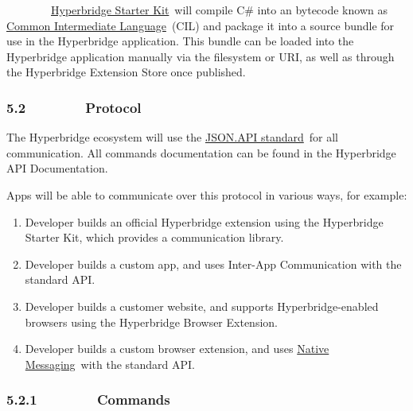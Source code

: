 \documentclass[]{article}
\providecommand{\tightlist}{%
  \setlength{\itemsep}{0pt}\setlength{\parskip}{0pt}}
\begin{document}
{~~~~~~~~}{\href{https://www.google.com/url?q=https://github.com/hyperbridge/app-extension-starter-kit\&sa=D\&ust=1512628005815000\&usg=AFQjCNF4Mysfxo1Na3-pmI7CPuwKxQxz5Q}{Hyperbridge
Starter Kit}}{~will compile C\# into an bytecode known as
}{\href{https://www.google.com/url?q=https://en.wikipedia.org/wiki/Common_Intermediate_Language\&sa=D\&ust=1512628005816000\&usg=AFQjCNFHw5_7yRB7FVoSH3CmepBrowLfZw}{Common
Intermediate Language}}{~(CIL) and package it into a source bundle for
use in the Hyperbridge application. This bundle can be loaded into the
Hyperbridge application manually via the filesystem or URI, as well as
through the Hyperbridge Extension Store once published.}

\hypertarget{h.we7809azv8r3}{%
\subsubsection{\texorpdfstring{{5.2~~~~~~~~Protocol}}{5.2~~~~~~~~Protocol}}\label{h.we7809azv8r3}}

{The Hyperbridge ecosystem will use the
}{\href{https://www.google.com/url?q=http://jsonapi.org/\&sa=D\&ust=1512628005817000\&usg=AFQjCNEV84NBgDKcI05cAwGE7nA6E464Ow}{JSON.API
standard}}{~for all communication. All commands documentation can be
found in the Hyperbridge API Documentation.}

{}

{Apps will be able to communicate over this protocol in various ways,
for example:}

\begin{enumerate}
\tightlist
\item
  {Developer builds an official Hyperbridge extension using the
  Hyperbridge Starter Kit, which provides a communication library.}
\item
  {Developer builds a custom app, and uses Inter-App Communication with
  the standard API.}
\item
  {Developer builds a customer website, and supports Hyperbridge-enabled
  browsers using the Hyperbridge Browser Extension.}
\item
  {Developer builds a custom browser extension, and uses
  }{\href{https://www.google.com/url?q=https://developer.chrome.com/apps/messaging\%23native-messaging\&sa=D\&ust=1512628005818000\&usg=AFQjCNHBYVx6ITNyuyUK6Itc05s9IIaJFg}{Native
  Messaging}}{~with the standard API.}
\end{enumerate}

\hypertarget{h.mxiezstpuut}{%
\subsubsection{\texorpdfstring{{5.2.1~~~~~~~~Commands}}{5.2.1~~~~~~~~Commands}}\label{h.mxiezstpuut}}
\end{document}
